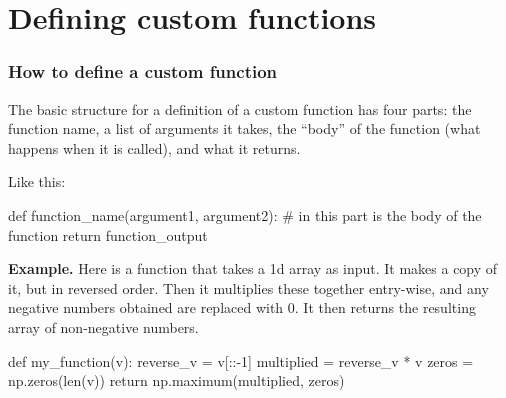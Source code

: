 \documentclass{beamer}
\newenvironment{codeblock}
    {\hfill\begin{beamerboxesrounded}[lower=codecol, width=0.8\textwidth]
    \medskip

    }
    { 
    \end{beamerboxesrounded}\hfill
    }
\theoremstyle{example}
\begin{document}
\section{Defining custom functions}


\begin{frame}[fragile]
    \frametitle{How to define a custom function}
The basic structure for a definition of a custom function has four parts: the function name, a list of arguments it takes, the ``body'' of the function (what happens when it is called), and what it returns.

Like this:

\begin{codeblock}

    \begin{python}
    def function_name(argument1, argument2):
        # in this part is the body of the function
        return function_output
    \end{python}
    
    \end{codeblock}
    
\pause
\textbf{Example.} Here is a function that takes a 1d array as input. It makes a copy of it, but in reversed order.  Then it multiplies these together entry-wise, and any negative numbers obtained are replaced with 0. It then returns the resulting array of non-negative numbers.

\pause
\begin{codeblock}

\begin{python}
def my_function(v):
    reverse_v = v[::-1]
    multiplied = reverse_v * v
    zeros = np.zeros(len(v))
    return np.maximum(multiplied, zeros)
\end{python}

\end{codeblock}

\end{frame}
\end{document}
